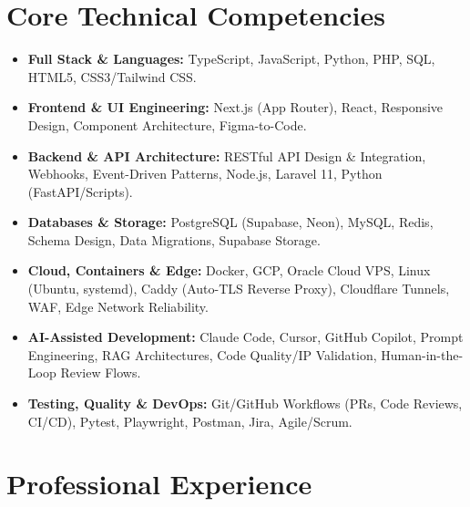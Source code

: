 \documentclass[10pt, a4paper]{article}
\begin{document}
\section*{Core Technical Competencies}
\begin{itemize}
    \item \textbf{Full Stack \& Languages:} TypeScript, JavaScript, Python, PHP, SQL, HTML5, CSS3/Tailwind CSS.
    \item \textbf{Frontend \& UI Engineering:} Next.js (App Router), React, Responsive Design, Component Architecture, Figma-to-Code.
    \item \textbf{Backend \& API Architecture:} RESTful API Design \& Integration, Webhooks, Event-Driven Patterns, Node.js, Laravel 11, Python (FastAPI/Scripts).
    \item \textbf{Databases \& Storage:} PostgreSQL (Supabase, Neon), MySQL, Redis, Schema Design, Data Migrations, Supabase Storage.
    \item \textbf{Cloud, Containers \& Edge:} Docker, GCP, Oracle Cloud VPS, Linux (Ubuntu, systemd), Caddy (Auto-TLS Reverse Proxy), Cloudflare Tunnels, WAF, Edge Network Reliability.
    \item \textbf{AI-Assisted Development:} Claude Code, Cursor, GitHub Copilot, Prompt Engineering, RAG Architectures, Code Quality/IP Validation, Human-in-the-Loop Review Flows.
    \item \textbf{Testing, Quality \& DevOps:} Git/GitHub Workflows (PRs, Code Reviews, CI/CD), Pytest, Playwright, Postman, Jira, Agile/Scrum.
\end{itemize}

\section*{Professional Experience}
\end{document}
